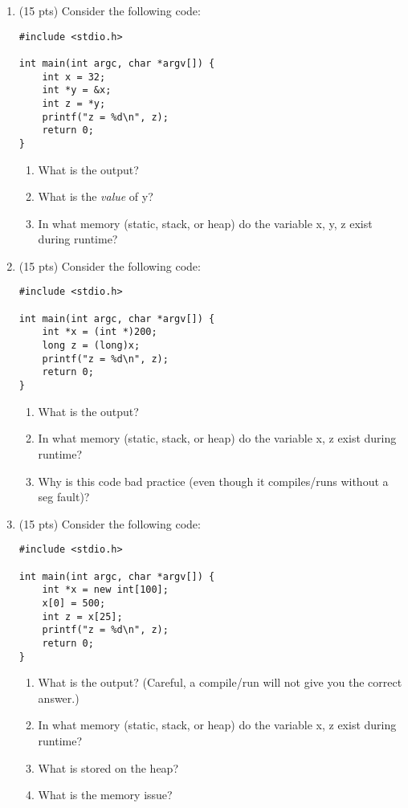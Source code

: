 \documentclass[12pt]{article}
\begin{document}
\begin{enumerate}
\item (15 pts) Consider the following code:\\
\begin{lstlisting}
#include <stdio.h>

int main(int argc, char *argv[]) {
    int x = 32;
    int *y = &x;
    int z = *y;
    printf("z = %d\n", z);
    return 0;
}

\end{lstlisting}
\begin{enumerate}
\item What is the output?
\item What is the \textit{value} of y?
\item In what memory (static, stack, or heap) do the variable x, y, z exist during runtime?
\end{enumerate}


\item (15 pts) Consider the following code:\\
\begin{lstlisting}
#include <stdio.h>

int main(int argc, char *argv[]) {
    int *x = (int *)200;
    long z = (long)x;
    printf("z = %d\n", z);
    return 0;
}

\end{lstlisting}
\begin{enumerate}
\item What is the output?
\item In what memory (static, stack, or heap) do the variable x, z exist during runtime?
\item Why is this code bad practice (even though it compiles/runs without a seg fault)?
\end{enumerate}

\pagebreak

\item (15 pts) Consider the following code:\\
\begin{lstlisting}
#include <stdio.h>

int main(int argc, char *argv[]) {
    int *x = new int[100];
    x[0] = 500;
    int z = x[25];
    printf("z = %d\n", z);
    return 0;
}
\end{lstlisting}
\begin{enumerate}
\item What is the output? (Careful, a compile/run will not give you the correct answer.)
\item In what memory (static, stack, or heap) do the variable x, z exist during runtime?
\item What is stored on the heap?
\item What is the memory issue?
\end{enumerate}


\end{enumerate}
\end{document}
